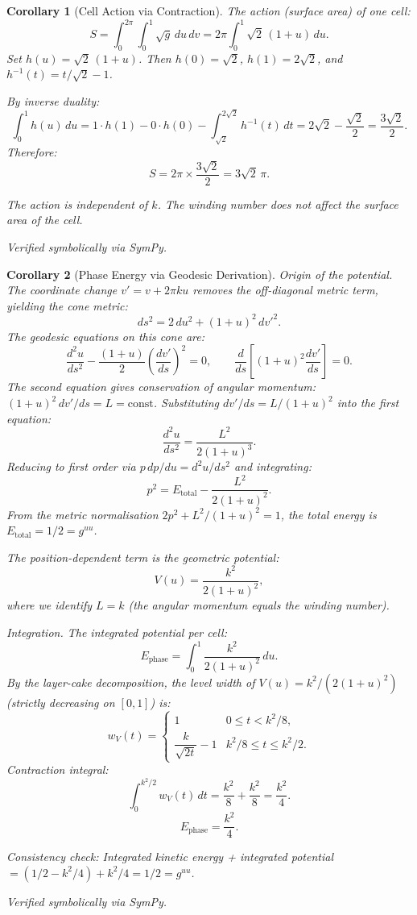 \documentclass[12pt]{amsart}
\newtheorem{corollary}{Corollary}
\begin{document}
\begin{corollary}[Cell Action via Contraction]
The action (surface area) of one cell:
\[
  S = \int_0^{2\pi} \int_0^1 \sqrt{g}\, du\, dv
    = 2\pi \int_0^1 \sqrt{2}\,(1+u)\, du.
\]
Set $h(u) = \sqrt{2}\,(1+u)$. Then $h(0) = \sqrt{2}$, $h(1) = 2\sqrt{2}$, and
$h^{-1}(t) = t/\sqrt{2} - 1$.

By inverse duality:
\[
  \int_0^1 h(u)\, du = 1 \cdot h(1) - 0 \cdot h(0)
    - \int_{\sqrt{2}}^{2\sqrt{2}} h^{-1}(t)\, dt
    = 2\sqrt{2} - \frac{\sqrt{2}}{2} = \frac{3\sqrt{2}}{2}.
\]
Therefore:
\[
  S = 2\pi \times \frac{3\sqrt{2}}{2} = 3\sqrt{2}\,\pi.
\]

The action is independent of $k$. The winding number does not affect the surface area of
the cell.

Verified symbolically via SymPy.
\end{corollary}

\begin{corollary}[Phase Energy via Geodesic Derivation]
\textit{Origin of the potential.} The coordinate change $v' = v + 2\pi k u$ removes the
off-diagonal metric term, yielding the cone metric:
\[
  ds^2 = 2\, du^2 + (1+u)^2\, dv'^2.
\]
The geodesic equations on this cone are:
\[
  \frac{d^2 u}{ds^2} - \frac{(1+u)}{2}\left(\frac{dv'}{ds}\right)^2 = 0,
  \qquad
  \frac{d}{ds}\left[(1+u)^2 \frac{dv'}{ds}\right] = 0.
\]
The second equation gives conservation of angular momentum:
$(1+u)^2\, dv'/ds = L = \text{const}$. Substituting $dv'/ds = L/(1+u)^2$ into the first
equation:
\[
  \frac{d^2 u}{ds^2} = \frac{L^2}{2(1+u)^3}.
\]
Reducing to first order via $p\, dp/du = d^2 u/ds^2$ and integrating:
\[
  p^2 = E_{\mathrm{total}} - \frac{L^2}{2(1+u)^2}.
\]
From the metric normalisation $2p^2 + L^2/(1+u)^2 = 1$, the total energy is
$E_{\mathrm{total}} = 1/2 = g^{uu}$.

The position-dependent term is the geometric potential:
\[
  V(u) = \frac{k^2}{2(1+u)^2},
\]
where we identify $L = k$ (the angular momentum equals the winding number).

\textit{Integration.} The integrated potential per cell:
\[
  E_{\mathrm{phase}} = \int_0^1 \frac{k^2}{2(1+u)^2}\, du.
\]
By the layer-cake decomposition, the level width of $V(u) = k^2/(2(1+u)^2)$ (strictly
decreasing on $[0,1]$) is:
\[
  w_V(t) = \begin{cases}
    1 & 0 \le t < k^2/8, \\
    \dfrac{k}{\sqrt{2t}} - 1 & k^2/8 \le t \le k^2/2.
  \end{cases}
\]
Contraction integral:
\[
  \int_0^{k^2/2} w_V(t)\, dt = \frac{k^2}{8} + \frac{k^2}{8} = \frac{k^2}{4}.
\]
\[
  E_{\mathrm{phase}} = \frac{k^2}{4}.
\]

\textit{Consistency check:} Integrated kinetic energy + integrated potential
$= (1/2 - k^2/4) + k^2/4 = 1/2 = g^{uu}$. \checkmark

Verified symbolically via SymPy.
\end{corollary}
\end{document}
